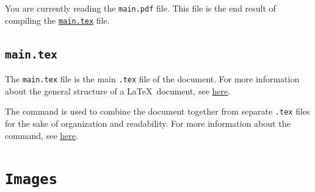 You are currently reading the \texttt{main.pdf} file. This file is the end result of compiling the \hyperref[sec:main.tex]{\texttt{main.tex}} file.

\subsection{\texttt{main.tex}}
\label{sec:main.tex}



The \texttt{main.tex} file is the main \texttt{.tex} file of the document.  For more information about the general structure of a \LaTeX\ document, see \href{https://en.wikibooks.org/wiki/LaTeX/Document_Structure#Global_structure}{here}. 

The \lstinline|| command is used to combine the document together from separate \texttt{.tex} files for the sake of organization and readability. For more information about the \lstinline|| command, see \href{https://en.wikibooks.org/wiki/LaTeX/Modular_Documents#Getting_LaTeX_to_process_multiple_files}{here}.

\section{\texttt{Images}}
\label{sec:images}

